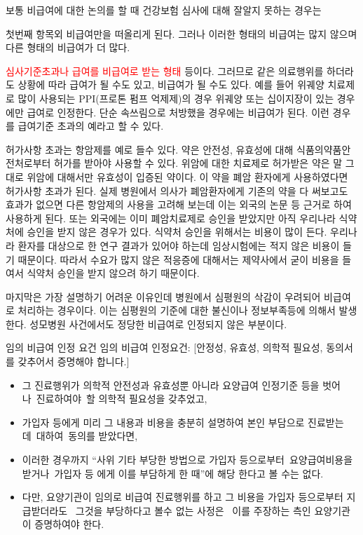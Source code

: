보통 비급여에 대한 논의를 할 때 건강보험 심사에 대해 잘알지 못하는 경우는 \par
첫번째 항목외 비급여만을 떠올리게 된다. 그러나 이러한 형태의 비급여는 많지 않으며 다른 형태의 비급여가 더 많다. \par

\textcolor{red}{심사기준초과나 급여를 비급여로 받는 형태} 등이다. 그러므로 같은 의료행위를 하더라도 상황에 따라 급여가 될 수도 있고, 비급여가 될 수도 있다. 예를 들어 위궤양 치료제로 많이 사용되는 PPI(프로톤 펌프 억제제)의 경우
위궤양 또는 십이지장이 있는 경우에만 급여로 인정한다. 단순 속쓰림으로 처방했을 경우에는 비급여가 된다. 이런 경우를 급여기준 초과의 예라고 할 수 있다.

허가사항 초과는 항암제를 예로 들수 있다. 약은 안전성, 유효성에 대해 식품의약품안전처로부터 허가를 받아야 사용할 수 있다. 위암에 대한 치료제로 허가받은 약은 말 그대로 위암에 대해서만 유효성이 입증된 약이다. 이 약을 폐암 환자에게 사용하였다면 허가사항 초과가 된다. 실제 병원에서 의사가 폐암환자에게 기존의 약을 다 써보고도 효과가 없으면 다른 항암제의 사용을 고려해 보는데 이는 외국의 논문 등 근거로 하여 사용하게 된다. 또는 외국에는 이미 폐암치료제로 승인을 받았지만 아직 우리나라 식약처에 승인을 받지 않은 경우가 있다. 식약처 승인을 위해서는 비용이 많이 든다. 우리나라 환자를 대상으로 한 연구 결과가 있어야 하는데 임상시험에는 적지 않은 비용이 들기 때문이다. 따라서 수요가 많지 않은 적응증에 대해서는 제약사에서 굳이 비용을 들여서 식약처 승인을 받지 않으려 하기 때문이다.

마지막은 가장 설명하기 어려운 이유인데 병원에서 심평원의 삭감이 우려되어 비급여로 처리하는 경우이다. 이는 심평원의 기준에 대한 불신이나 정보부족등에 의해서 발생한다. 성모병원 사건에서도 정당한 비급여로 인정되지 않은 부분이다. 
\begin{commentbox}{임의 비급여 인정 요건}
임의 비급여 인정요건: [안정성, 유효성, 의학적 필요성, 동의서를 갖추어서 증명해야 합니다.]

\begin{itemize}\tightlist
\item 그 진료행위가 의학적 안전성과 유효성뿐 아니라 요양급여 인정기준 등을 벗어나 진료하여야 할 의학적 필요성을 갖추었고,
\item 가입자 등에게 미리 그 내용과 비용을 충분히 설명하여 본인 부담으로 진료받는 데 대하여 동의를 받았다면, 
\item 이러한 경우까지 “사위 기타 부당한 방법으로 가입자 등으로부터 요양급여비용을 받거나 가입자 등 에게 이를 부담하게 한 때”에 해당 한다고 볼 수는 없다.
\item 다만, 요양기관이 임의로 비급여 진료행위를 하고 그 비용을 가입자 등으로부터 지급받더라도  그것을 부당하다고 볼수 없는 사정은  이를 주장하는 측인 요양기관이 증명하여야 한다.
\end{itemize}
\end{commentbox}

